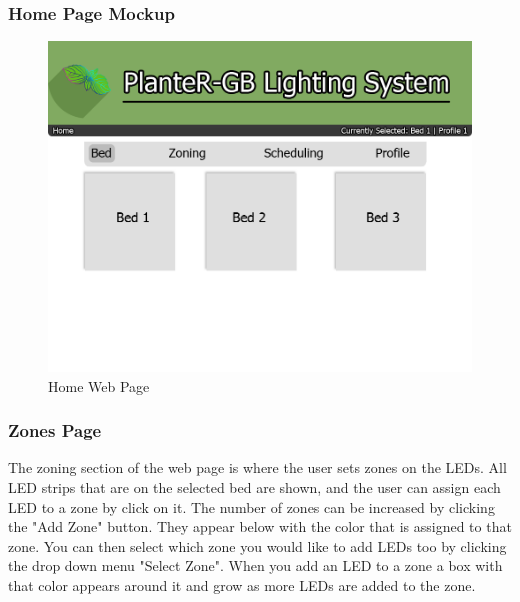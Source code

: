 			            \subsubsection{Home Page Mockup}
			            \begin{center}
			                \begin{figure}[H]
			                    \includegraphics[width=\linewidth]{web_design/BedPage.png}
			                    \caption{Home Web Page}
			                    \label{fig:Home Page}
			                \end{figure}
			            \end{center}
			            \subsubsection{Zones Page}
			            The zoning section of the web page is where the user sets zones on
			            the LEDs. All LED strips that are on the selected bed are shown, and the user can assign each LED to a zone by click on it.
									The number of zones can be increased by clicking the "Add Zone" button.
									They appear below with the color that is assigned to that zone. You can then select
			            which zone you would like to add LEDs too by clicking the drop down menu "Select Zone".
			            When you add an LED to a zone a box with that color appears around it
			            and grow as more LEDs are added to the zone.
